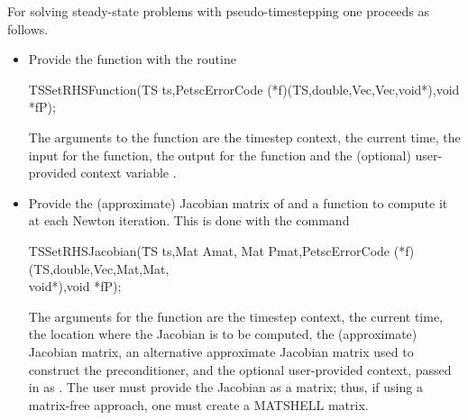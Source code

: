 For solving steady-state problems with pseudo-timestepping one proceeds
as follows.
\begin{itemize}
\item Provide the function  with the routine
\begin{tabbing}
 TSSetRHSFunction(TS ts,PetscErrorCode (*f)(TS,double,Vec,Vec,void*),void *fP);
\end{tabbing}
The  arguments to the function  are
the timestep context, the current time, the input for the function,
the output for the function and the (optional) user-provided context
variable .

\item Provide the (approximate) Jacobian matrix of  and a
function to compute it at each Newton iteration. This is done with the command
\begin{tabbing}
 TSSetRHSJacobian(\=TS ts,Mat Amat, Mat Pmat,PetscErrorCode (*f)(TS,double,Vec,Mat,Mat,\\
                  \>        void*),void *fP);
\end{tabbing}
The  arguments for the function  are
the timestep context, the current time, the location where the
Jacobian is to be computed, the (approximate) Jacobian matrix, an alternative
approximate Jacobian matrix used to construct the preconditioner, and the optional
user-provided context, passed in as . The user must provide the
Jacobian as a matrix; thus, if using a matrix-free approach, one
must create a MATSHELL matrix.
\end{itemize}

